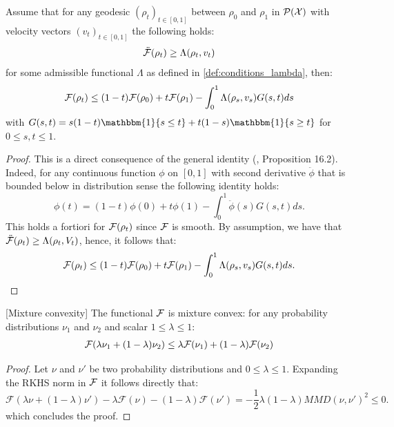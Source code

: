 \begin{lemma}\label{lem:integral_lambda_convexity}
Assume that for any geodesic $(\rho_{t})_{t\in[0,1]}$ between
$\rho_{0}$ and $\rho_{1}$ in $\mathcal{P}({{\mathcal X}})$ with velocity vectors $(v_t)_{t \in [0,1]}$ the following holds:
\[
\ddot{{{\mathcal F}}}(\rho_{t}) \geq \Lambda(\rho_t,v_t)
\]
for some admissible functional $\Lambda$ as defined in \cref{def:conditions_lambda}, then:
\begin{align*}
{{\mathcal F}}(\rho_{t})\leq(1-t){{\mathcal F}}(\rho_{0})+t{{\mathcal F}}(\rho_{1})-\int_{0}^{1}\Lambda(\rho_{s},v_{s})G(s,t)ds
\end{align*}
with $G(s,t)=s(1-t) \mathbbm{1}\{s\leq t\}
+t(1-s) \mathbbm{1}\{s\geq t\}$ for $0\leq s,t\leq 1$.

\end{lemma}
\begin{proof}
	This is a direct consequence of the general identity (\cite{Villani:2009},
	Proposition 16.2). Indeed, for any continuous function $\phi$ on
	$[0,1]$ with second derivative $\ddot{\phi}$ that is bounded below
	in distribution sense the following identity holds:
	\[
	\phi(t)=(1-t)\phi(0)+t\phi(1)-\int_{0}^{1}\ddot{\phi}(s)G(s,t)ds.
	\]
	This holds a fortiori for ${{\mathcal F}}(\rho_{t})$ since ${{\mathcal F}}$ is smooth. By assumption, we have that $\ddot{{{\mathcal F}}}(\rho_{t}) \geq \Lambda(\rho_t,V_t)$, hence, it follows that:
	\[
	{{\mathcal F}}(\rho_{t})\leq(1-t){{\mathcal F}}(\rho_{0})+t{{\mathcal F}}(\rho_{1})-\int_{0}^{1}\Lambda(\rho_{s},v_{s})G(s,t)ds.
	\]
\end{proof}


\begin{lemma}\label{lem:mixture_convexity}[Mixture convexity]
	The functional ${{\mathcal F}}$ is mixture convex: for any probability distributions $\nu_1$ and $\nu_2$ and scalar $1\leq \lambda\leq 1$:
	\begin{align*}
	{{\mathcal F}}(\lambda \nu_1+(1-\lambda)\nu_2)\leq \lambda {{\mathcal F}}(\nu_1)+ (1-\lambda){{\mathcal F}}(\nu_2)
	\end{align*}
\end{lemma}
\begin{proof}
	Let $\nu$ and $\nu'$ be two probability distributions and $0\leq \lambda\leq 1$. Expanding the RKHS norm in ${{\mathcal F}}$ it follows directly that:
	\[
		\mathcal{F}(\lambda \nu + (1-\lambda)\nu') -\lambda \mathcal{F}(\nu) -(1-\lambda)\mathcal{F}(\nu') = -\frac{1}{2}\lambda(1-\lambda)MMD(\nu,\nu')^2 \leq 0.
	\]
	which concludes the proof.
\end{proof}


